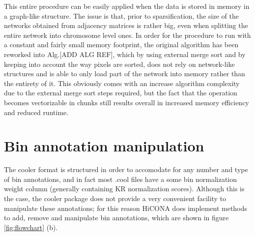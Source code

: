 This entire procedure can be easily applied when the data is stored in memory in a graph-like structure. The issue is that, prior to sparsification, the size of the networks obtained from adjacency matrices is rather big, even when splitting the entire network into chromosome level ones. In order for the procedure to run with a constant and fairly small memory footprint, the original algorithm has been reworked into Alg.[ADD ALG REF], which by using external merge sort and by keeping into account the way pixels are sorted, does not rely on network-like structures and is able to only load part of the network into memory rather than the entirety of it. This obviously comes with an increase algorithm complexity due to the external merge sort steps required, but the fact that the operation becomes vectorizable in chunks still results overall in increased memory efficiency and reduced runtime. 



\section{Bin annotation manipulation}

The cooler format is structured in order to accomodate for any number and type of bin annotations, and in fact most .cool files have a some bin normalization weight column (generally containing KR normalization scores). Although this is the case, the cooler package does not provide a very convenient facility to manipulate these annotations; for this reason HiCONA does implement methods to add, remove and manipulate bin annotations, which are shown in figure \ref{fig:flowchart} (b). 

